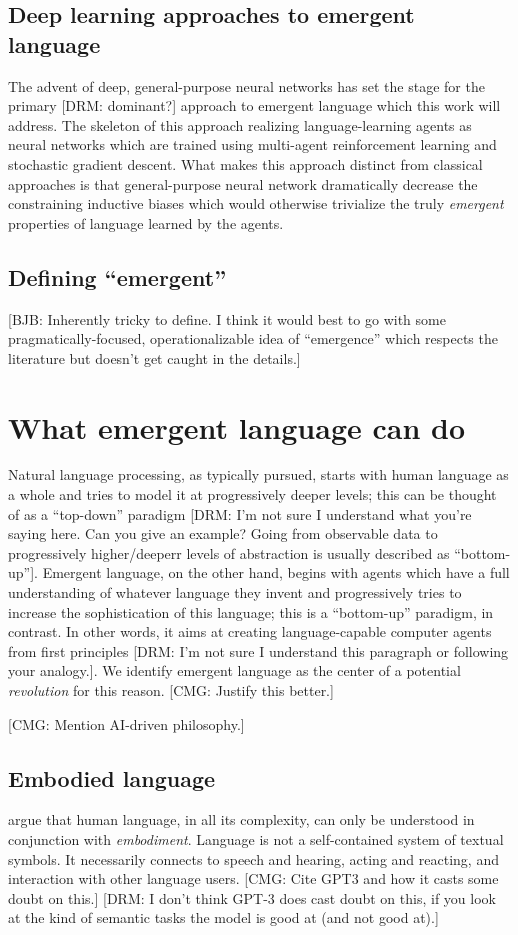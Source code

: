 \documentclass[letterpaper]{report}
\newcommand\bjb[1]{{\color{blue}[BJB: #1]}}
\newcommand\cmg[1]{{\color{gray}[CMG: #1]}}
\newcommand\drm[1]{{\color{red}[DRM: #1]}}
\begin{document}
\subsection{Deep learning approaches to emergent language}
The advent of deep, general-purpose neural networks has set the stage for the primary \drm{dominant?} approach to emergent language which this work will address.
The skeleton of this approach realizing language-learning agents as neural networks which are trained using multi-agent reinforcement learning and stochastic gradient descent.
What makes this approach distinct from classical approaches is that general-purpose neural network dramatically decrease the constraining inductive biases which would otherwise trivialize the truly \emph{emergent} properties of language learned by the agents.

\subsection{Defining ``emergent''}
\bjb{Inherently tricky to define. I think it would best to go with some pragmatically-focused, operationalizable idea of ``emergence'' which respects the literature but doesn't get caught in the details.}

\section{What emergent language can do}
Natural language processing, as typically pursued, starts with human language as a whole and tries to model it at progressively deeper levels; this can be thought of as a ``top-down'' paradigm \drm{I'm not sure I understand what you're saying here. Can you give an example? Going from observable data to progressively higher/deeperr levels of abstraction is usually described as ``bottom-up''}.
Emergent language, on the other hand, begins with agents which have a full understanding of whatever language they invent and progressively tries to increase the sophistication of this language; this is a ``bottom-up'' paradigm, in contrast.
In other words, it aims at creating language-capable computer agents from first principles \drm{I'm not sure I understand this paragraph or following your analogy.}.
We identify emergent language as the center of a potential \emph{revolution} for this reason.
\cmg{Justify this better.}

\cmg{Mention AI-driven philosophy.}

\subsection{Embodied language}
\citet{bisk_experience_2020} argue that human language, in all its complexity, can only be understood in conjunction with \emph{embodiment}.
Language is not a self-contained system of textual symbols. It necessarily connects to speech and hearing, acting and reacting, and interaction with other language users.
\cmg{Cite GPT3 and how it casts some doubt on this.} \drm{I don't think GPT-3 does cast doubt on this, if you look at the kind of semantic tasks the model is good at (and not good at).}
\end{document}

